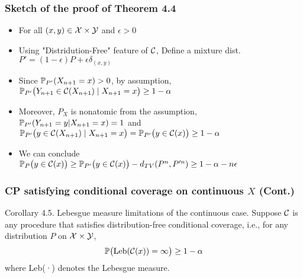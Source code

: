 \documentclass[compress]{beamer}
\begin{document}
\begin{frame}\frametitle{Sketch of the proof of Theorem 4.4}
	\begin{itemize}
		\item For all $(x, y)\in\cX\times\cY$ and $\epsilon>0$\\
		\item Using "Distridution-Free" feature of $\cC$, Define a mixture dist.
		$P' = (1-\epsilon)P+\epsilon\delta_{(x, y)}$\\
		\item Since $\P_{P'}(X_{n+1}=x) > 0$, by assumption, $\P_{P'}\big(Y_{n+1}\in\cC(X_{n+1})\mid X_{n+1}=x\big)\geq 1-\alpha$
		\item Moreover, $P_X$ is nonatomic from the assumption,\\ 
		$\P_{P'}(Y_{n+1}=y|X_{n+1}=x) = 1$ and
		$\P_{P'}\big(y\in\cC(X_{n+1})\mid X_{n+1} = x\big) = \P_{P'}\big(y\in\cC(x)\big) \geq 1-\alpha$
		\item We can conclude
		\\$\P_{P}\big(y\in\cC(x)\big)\ge \P_{P'}\big(y\in\cC(x)\big)-d_{TV}(P^n, P'^{n})\ge 1-\alpha-n\epsilon$
	\end{itemize}
\end{frame}

\begin{frame}\frametitle{CP satisfying conditional coverage on continuous $X$ (Cont.)}
	\begin{block}{Corollary 4.5. Lebesgue measure limitations of the continuous case.}
		Suppose $\cC$ is any procedure that satisfies distribution-free conditional coverage, i.e., for any distribution $P$ on $\cX\times\cY$,
		\begin{align*}
			\P\big(\textnormal{Leb}(\cC(x)) = \infty\big)\geq 1-\alpha
		\end{align*}
		where Leb(·) denotes the Lebesgue measure.
	\end{block}
\end{frame}
\end{document}
